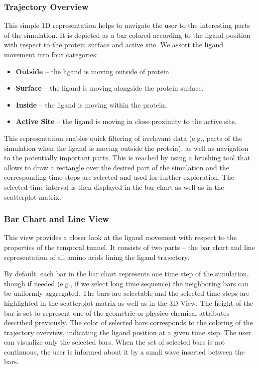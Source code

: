 \documentclass[twocolumn]{bmcart}%
\begin{document}
\subsubsection*{Trajectory Overview}
This simple 1D representation helps to navigate the user to the interesting parts of the simulation.
It is depicted as a bar colored according to the ligand position with respect to the protein surface and active site.
We assort the ligand movement into four categories: 
\begin{itemize}
\item \textbf{Outside} -- the ligand is moving outside of protein.
\item \textbf{Surface} -- the ligand is moving alongside the protein surface.
\item \textbf{Inside} -- the ligand is moving within the protein.
\item \textbf{Active Site} -- the ligand is moving in close proximity to the active site.
\end{itemize}
This representation enables quick filtering of irrelevant data (e.g., parts of the simulation when the ligand is moving outside the protein), as well as navigation to the potentially important parts.
This is reached by using a brushing tool that allows to draw a rectangle over the desired part of the simulation and the corresponding time steps are selected and used for further exploration.
The selected time interval is then displayed in the bar chart as well as in the scatterplot matrix.

\subsubsection*{Bar Chart and Line View}
This view provides a closer look at the ligand movement with respect to the properties of the temporal tunnel.
It consists of two parts -- the bar chart and line representation of all amino acids lining the ligand trajectory.

By default, each bar in the bar chart represents one time step of the simulation, though if needed (e.g., if we select long time sequence) the neighboring bars can be uniformly aggregated.
The bars are selectable and the selected time steps are highlighted in the scatterplot matrix as well as in the 3D View.
The height of the bar is set to represent one of the geometric or physico-chemical attributes described previously.
The color of selected bars corresponds to the coloring of the trajectory overview, indicating the ligand position at a given time step.
The user can visualize only the selected bars.
When the set of selected bars is not continuous, the user is informed about it by a small wave inserted between the bars.
\end{document}
